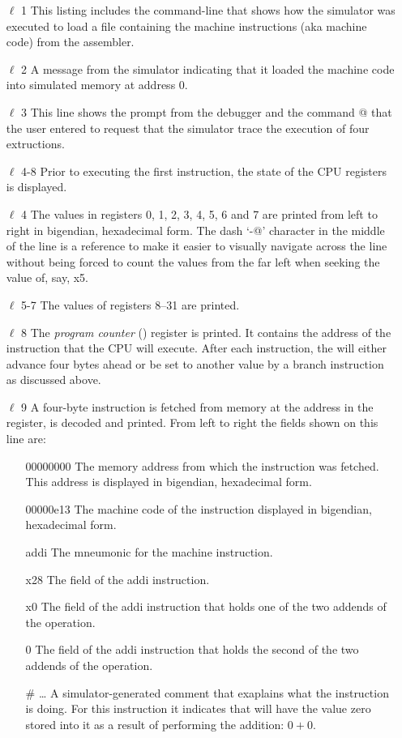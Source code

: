 \begin{itemize}
\item [$\ell$ 1] This listing includes the command-line that shows how the simulator
	was executed to load a file containing the machine instructions (aka
	machine code) from the assembler.
\item [$\ell$ 2] A message from the simulator indicating that it loaded the machine
	code into simulated memory at address 0.
\item [$\ell$ 3] This line shows the prompt from the debugger and the command
	@ that the user entered to request that the simulator trace 
	the execution of four extructions.
\item [$\ell$ 4-8] Prior to executing the first instruction, the state of the
	CPU registers is displayed.  
\item [$\ell$ 4] The values in registers 0, 1, 2, 3, 4, 5, 6 and 7 are printed 
	from left to right in \gls{bigendian}, \gls{hexadecimal} form.  
	The dash `\verb@-@' character in the middle of the line is a reference 
	to make it easier to visually navigate across the line without being
	forced to count the values from the far left when seeking the value 
	of, say, x5.
\item [$\ell$ 5-7] The values of registers 8--31 are printed.
\item [$\ell$ 8] The {\em program counter} () register is printed.  
	It contains the address of the instruction that the CPU will execute.  
	After each instruction, the  will either advance four bytes 
	ahead or be set to another value by a branch instruction as discussed above.
\item [$\ell$ 9] A four-byte instruction is fetched from memory at the address
	in the  register, is decoded and printed.  From left to right
	the fields shown on this line are:

	\begin{itemize}

	\item [00000000] The memory address from which the instruction was
		fetched.  This address is displayed in \gls{bigendian},
		\gls{hexadecimal} form.
	\item [00000e13] The machine code of the instruction displayed in 
		\gls{bigendian}, \gls{hexadecimal} form.
	\item [addi] The mneumonic for the machine instruction.
	\item [x28] The  field of the addi instruction.  
	\item [x0] The  field of the addi instruction that
		holds one of the two addends of the operation.
	\item [0] The  field of the addi instruction that
		holds the second of the two addends of the operation.
	\item [\# \ldots] A simulator-generated comment that exaplains
		what the instruction is doing.  For this instruction it indicates 
		that  will have the value zero stored into it as a result 
		of performing the addition: $0+0$.
	\end{itemize}


\end{itemize}
